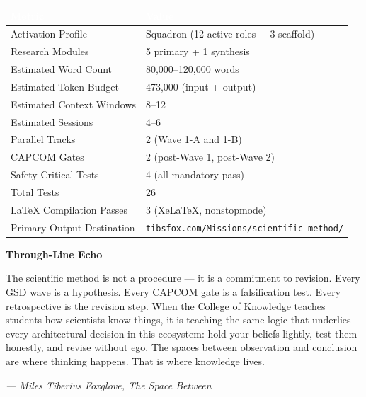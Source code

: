\documentclass[11pt,letterpaper]{article}
\newcommand{\tableheader}[1]{\textbf{\sffamily\textcolor{white}{#1}}}
\begin{document}
\begin{center}
\begin{tabularx}{\textwidth}{L{5cm}X}
\toprule
{}
\tableheader{Metric} & \tableheader{Value} \\
\midrule
Activation Profile & Squadron (12 active roles + 3 scaffold) \\
Research Modules & 5 primary + 1 synthesis \\
Estimated Word Count & 80,000--120,000 words \\
Estimated Token Budget & 473,000 (input + output) \\
Estimated Context Windows & 8--12 \\
Estimated Sessions & 4--6 \\
Parallel Tracks & 2 (Wave 1-A and 1-B) \\
CAPCOM Gates & 2 (post-Wave 1, post-Wave 2) \\
Safety-Critical Tests & 4 (all mandatory-pass) \\
Total Tests & 26 \\
LaTeX Compilation Passes & 3 (XeLaTeX, nonstopmode) \\
Primary Output Destination & \texttt{tibsfox.com/Missions/scientific-method/} \\
\bottomrule
\end{tabularx}
\end{center}

\vspace{2em}

\begin{quotebox}
\textbf{\sffamily Through-Line Echo}

\medskip

The scientific method is not a procedure --- it is a commitment to revision. Every GSD wave is a hypothesis. Every CAPCOM gate is a falsification test. Every retrospective is the revision step. When the College of Knowledge teaches students how scientists know things, it is teaching the same logic that underlies every architectural decision in this ecosystem: hold your beliefs lightly, test them honestly, and revise without ego. The spaces between observation and conclusion are where thinking happens. That is where knowledge lives.

\medskip

\textit{--- Miles Tiberius Foxglove, The Space Between}
\end{quotebox}
\end{document}

